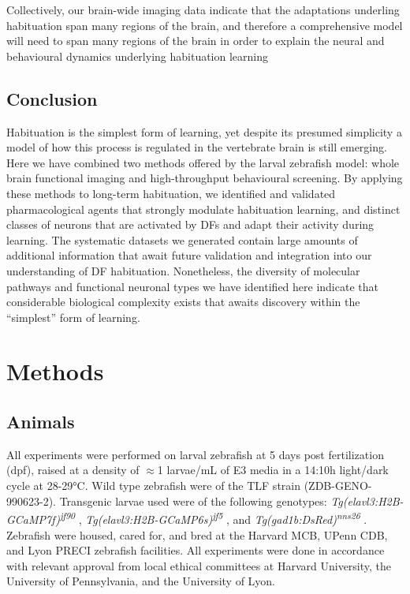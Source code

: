 \documentclass[9pt,lineno]{RandlettLab_elife}
\begin{document}
Collectively, our brain-wide imaging data indicate that the adaptations underling habituation span many regions of the brain, and therefore a comprehensive model will need to span many regions of the brain in order to explain the neural and behavioural dynamics underlying habituation learning 

\subsection{Conclusion}

Habituation is the simplest form of learning, yet despite its presumed simplicity a model of how this process is regulated in the vertebrate brain is still emerging. Here we have combined two methods offered by the larval zebrafish model: whole brain functional imaging and high-throughput behavioural screening. By applying these methods to long-term habituation, we identified and validated pharmacological agents that strongly modulate habituation learning, and distinct classes of neurons that are activated by DFs and adapt their activity during learning. The systematic datasets we generated contain large amounts of additional information that await future validation and integration into our understanding of DF habituation. Nonetheless, the diversity of molecular pathways and functional neuronal types we have identified here indicate that considerable biological complexity exists that awaits discovery within the “simplest” form of learning. 

\section{Methods}

\subsection{Animals}

All experiments were performed on larval zebrafish at 5 days post fertilization (dpf), raised at a density of $\approx$1 larvae/mL of E3 media in a 14:10h light/dark cycle at 28-29°C. Wild type zebrafish were of the TLF strain (ZDB-GENO-990623-2). Transgenic larvae used were of the following genotypes: \emph{Tg(elavl3:H2B-GCaMP7f)\textsuperscript{jf90}} \citep{Yang2021-uf}, \emph{Tg(elavl3:H2B-GCaMP6s)\textsuperscript{jf5}} \citep{Freeman2014-yo}, and \emph{Tg(gad1b:DsRed)\textsuperscript{nns26}} \citep{Satou2013-pp}. Zebrafish were housed, cared for, and bred at the Harvard MCB, UPenn CDB, and Lyon PRECI zebrafish facilities. All experiments were done in accordance with relevant approval from local ethical committees at Harvard University, the University of Pennsylvania, and the University of Lyon. 
\end{document}
